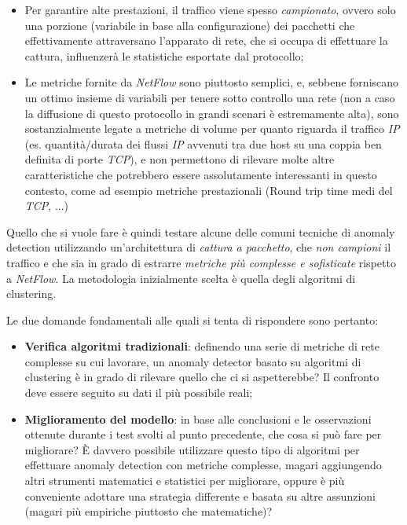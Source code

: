 \documentclass[12pt,a4paper,cucitura]{toptesi}
\begin{document}
\begin{itemize}
\item Per garantire alte prestazioni, il traffico viene spesso \emph{campionato}, ovvero solo una porzione (variabile in base alla configurazione) dei pacchetti che effettivamente attraversano l'apparato di rete, che si occupa di effettuare la cattura, influenzerà le statistiche esportate dal protocollo;
\item Le metriche fornite da \emph{NetFlow} sono piuttosto semplici, e, sebbene forniscano un ottimo insieme di variabili per tenere sotto controllo una rete (non a caso la diffusione di questo protocollo in grandi scenari è estremamente alta), sono sostanzialmente legate a metriche di volume per quanto riguarda il traffico \emph{IP} (es. quantità/durata dei flussi \emph{IP} avvenuti tra due host su una coppia ben definita di porte \emph{TCP}), e non permettono di rilevare molte altre caratteristiche che potrebbero essere assolutamente interessanti in questo contesto, come ad esempio metriche prestazionali (Round trip time medi del \emph{TCP}, ...)
\end{itemize}

Quello che si vuole fare è quindi testare alcune delle comuni tecniche di anomaly detection utilizzando un'architettura di \emph{cattura a pacchetto}, che \emph{non campioni} il traffico e che sia in grado di estrarre \emph{metriche più complesse e sofisticate} rispetto a \emph{NetFlow}.
La metodologia inizialmente scelta è quella degli algoritmi di clustering.

Le due domande fondamentali alle quali si tenta di rispondere sono pertanto:

\begin{itemize}
\item \textbf{Verifica algoritmi tradizionali}: definendo una serie di metriche di rete complesse su cui lavorare, un anomaly detector basato su algoritmi di clustering è in grado di rilevare quello che ci si aspetterebbe? Il confronto deve essere seguito su dati il più possibile reali;
\item \textbf{Miglioramento del modello}: in base alle conclusioni e le osservazioni ottenute durante i test svolti al punto precedente, che cosa si può fare per migliorare? \`{E} davvero possibile utilizzare questo tipo di algoritmi per effettuare anomaly detection con metriche complesse, magari aggiungendo altri strumenti matematici e statistici per migliorare, oppure è più conveniente adottare una strategia differente e basata su altre assunzioni (magari più empiriche piuttosto che matematiche)? 
\end{itemize}
\end{document}
